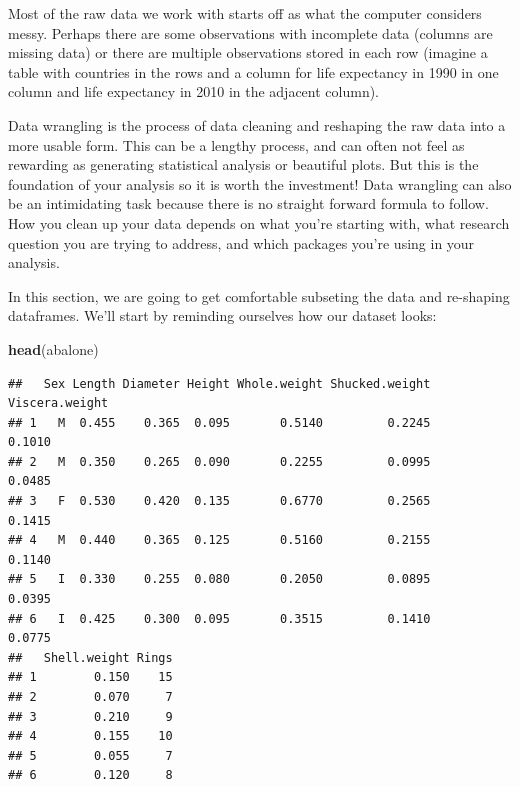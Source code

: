 \documentclass[
]{book}
\newenvironment{Shaded}{\begin{snugshade}}{\end{snugshade}}
\newcommand{\FunctionTok}[1]{\textcolor[rgb]{0.13,0.29,0.53}{\textbf{#1}}}
\newcommand{\NormalTok}[1]{#1}
\newcommand{\OtherTok}[1]{\textcolor[rgb]{0.56,0.35,0.01}{#1}}
\newcommand{\SpecialCharTok}[1]{\textcolor[rgb]{0.81,0.36,0.00}{\textbf{#1}}}
\begin{document}
Most of the raw data we work with starts off as what the computer considers messy. Perhaps there are some observations with incomplete data (columns are missing data) or there are multiple observations stored in each row (imagine a table with countries in the rows and a column for life expectancy in 1990 in one column and life expectancy in 2010 in the adjacent column).

Data wrangling is the process of data cleaning and reshaping the raw data into a more usable form. This can be a lengthy process, and can often not feel as rewarding as generating statistical analysis or beautiful plots. But this is the foundation of your analysis so it is worth the investment! Data wrangling can also be an intimidating task because there is no straight forward formula to follow. How you clean up your data depends on what you're starting with, what research question you are trying to address, and which packages you're using in your analysis.

In this section, we are going to get comfortable subseting the data and re-shaping dataframes. We'll start by reminding ourselves how our dataset looks:

\begin{Shaded}
\begin{Highlighting}[]
\FunctionTok{head}\NormalTok{(abalone)}
\end{Highlighting}
\end{Shaded}

\begin{verbatim}
##   Sex Length Diameter Height Whole.weight Shucked.weight Viscera.weight
## 1   M  0.455    0.365  0.095       0.5140         0.2245         0.1010
## 2   M  0.350    0.265  0.090       0.2255         0.0995         0.0485
## 3   F  0.530    0.420  0.135       0.6770         0.2565         0.1415
## 4   M  0.440    0.365  0.125       0.5160         0.2155         0.1140
## 5   I  0.330    0.255  0.080       0.2050         0.0895         0.0395
## 6   I  0.425    0.300  0.095       0.3515         0.1410         0.0775
##   Shell.weight Rings
## 1        0.150    15
## 2        0.070     7
## 3        0.210     9
## 4        0.155    10
## 5        0.055     7
## 6        0.120     8
\end{verbatim}

\begin{Shaded}
\end{Shaded}
\end{document}
